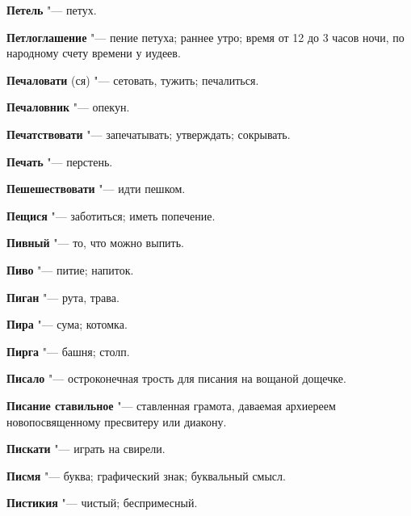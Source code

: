 \begin{mymulticols}{2}
\noindent\textbf{Петель} "--- петух. 




\noindent\textbf{Петлоглашение} "--- пение петуха; раннее утро; время от 12 до 3 часов ночи, по народному счету времени у иудеев. 




\noindent\textbf{Печаловати} (ся) "--- сетовать, тужить; печалиться. 




\noindent\textbf{Печаловник} "--- опекун. 




\noindent\textbf{Печатствовати} "--- запечатывать; утверждать; сокрывать. 




\noindent\textbf{Печать} "--- перстень. 




\noindent\textbf{Пешешествовати} "--- идти пешком. 




\noindent\textbf{Пещися} "--- заботиться; иметь попечение. 




\noindent\textbf{Пивный} "--- то, что можно выпить. 




\noindent\textbf{Пиво} "--- питие; напиток. 




\noindent\textbf{Пиган} "--- рута, трава. 




\noindent\textbf{Пира} "--- сума; котомка. 




\noindent\textbf{Пирга} "--- башня; столп. 




\noindent\textbf{Писало} "--- остроконечная трость для писания на вощаной дощечке. 




\noindent\textbf{Писание ставильное} "--- ставленная грамота, даваемая архиереем новопосвященному пресвитеру или диакону. 




\noindent\textbf{Пискати} "--- играть на свирели. 




\noindent\textbf{Писмя} "--- буква; графический знак; буквальный смысл. 




\noindent\textbf{Пистикия} "--- чистый; беспримесный. 





\end{mymulticols}
